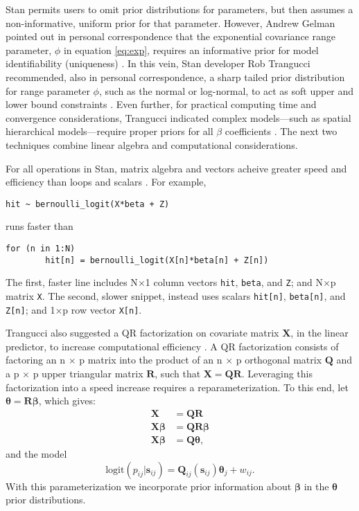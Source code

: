 Stan permits users to omit prior distributions for parameters, but then assumes a non-informative, uniform prior for that parameter. However, Andrew Gelman pointed out in personal correspondence that the exponential covariance range parameter, $\phi$ in equation \ref{eq:exp}, requires an informative prior for model identifiability (uniqueness) \citep{Gelman2014}. In this vein, Stan developer Rob Trangucci recommended, also in personal correspondence, a sharp tailed prior distribution for range parameter $\phi$, such as the normal or log-normal, to act as soft upper and lower bound constraints \citep{Trangucci}. Even further, for practical computing time and convergence considerations, Trangucci indicated complex models---such as spatial hierarchical models---require proper priors for all $\beta$ coefficients \citep{Trangucci}. The next two techniques combine linear algebra and computational considerations.

For all operations in Stan, matrix algebra and vectors acheive greater speed and efficiency than loops and scalars \citep{STANtheMan}. For example, 
\begin{verbatim}
hit ~ bernoulli_logit(X*beta + Z)
\end{verbatim}
runs faster than
\begin{verbatim}
for (n in 1:N)
        hit[n] = bernoulli_logit(X[n]*beta[n] + Z[n])
\end{verbatim}
The first, faster line includes N$\times$1 column vectors \verb|hit|, \verb|beta|, and \verb|Z|; and N$\times$p matrix \verb|X|. The second, slower snippet, instead uses scalars \verb|hit[n]|, \verb|beta[n]|, and \verb|Z[n]|; and 1$\times$p row vector \verb|X[n]|.

Trangucci also suggested a QR factorization on covariate matrix $\pmb{X}$, in the linear predictor, to increase computational efficiency \citep{Trangucci}. A QR factorization consists of factoring an n $\times$ p matrix into the product of an n $\times$ p orthogonal matrix $\pmb{Q}$ and a p $\times$ p upper triangular matrix $\pmb{R}$, such that $\pmb{X} = \pmb{QR}$. Leveraging this factorization into a speed increase requires a reparameterization. To this end, let $\pmb{\theta} = \pmb{R \beta}$, which gives:
\begin{align}
\pmb{X} &= \pmb{QR} \\
\pmb{X \beta} &= \pmb{QR \beta} \\
\pmb{X \beta} &= \pmb{Q \theta},
\end{align}
and the model
\begin{equation} \label{eq:reparam}
\text{logit}(p_{ij}|\pmb{s}_{ij}) = \pmb{Q}_{ij}(\pmb{s}_{ij}) \pmb{\theta}_{j} + w_{ij}.
\end{equation}
With this parameterization we incorporate prior information about $\pmb{\beta}$ in the $\pmb{\theta}$ prior distributions. 

